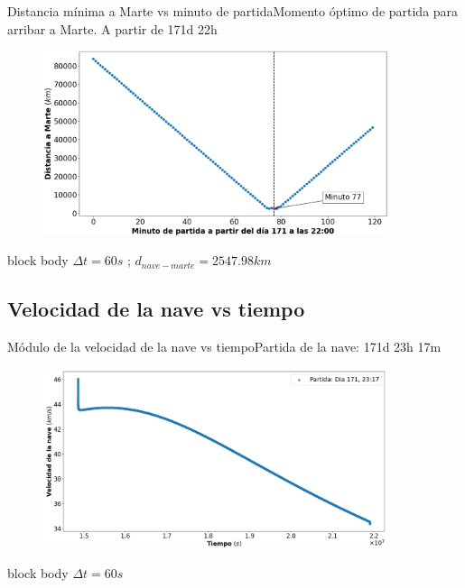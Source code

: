 \documentclass{beamer}
\begin{document}
            \begin{frame}{Distancia mínima a Marte vs minuto de partida}{Momento óptimo de partida para arribar a Marte. A partir de 171d 22h}
                \begin{figure}[H!]
                    \includegraphics[width=0.9\textwidth]{./distancia_a_marte_vs_minuto_de_partida}
                    \label{fig:marte_7}
                \end{figure}
                \begin{beamercolorbox}[sep=5pt,center]{block body}
                    \centering
                    \small{$\Delta t = 60s$ ; $d_{nave-marte} = 2547.98 km$}
                \end{beamercolorbox}
            \end{frame}

        \subsection{Velocidad de la nave vs tiempo}

            \begin{frame}{Módulo de la velocidad de la nave vs tiempo}{Partida de la nave: 171d 23h 17m}
                \begin{figure}[H!]
                    \includegraphics[width=0.9\textwidth]{./velocity_vs_time_for_travel_to_mars}
                    \label{fig:marte_8}
                \end{figure}
                \begin{beamercolorbox}[sep=5pt,center]{block body}
                    \centering
                    \small{$\Delta t = 60s$}
                \end{beamercolorbox}
            \end{frame}
\end{document}
